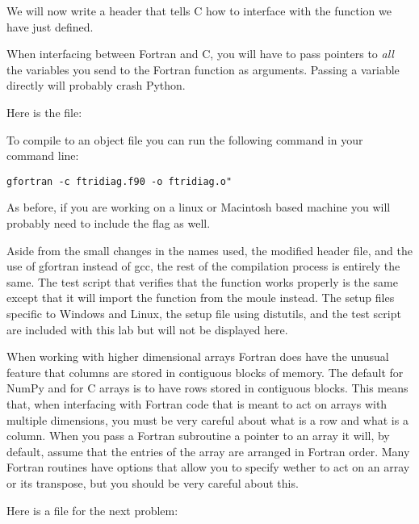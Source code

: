 We will now write a header that tells C how to interface with the function we have just defined.
\begin{warn}
When interfacing between Fortran and C, you will have to pass pointers to \emph{all} the variables you send to the Fortran function as arguments.
Passing a variable directly will probably crash Python.
\end{warn}
Here is the file:


To compile  to an object file you can run the following command in your command line:
\begin{lstlisting}[style=ShellInput]
gfortran -c ftridiag.f90 -o ftridiag.o"
\end{lstlisting}
As before, if you are working on a linux or Macintosh based machine you will probably need to include the  flag as well.

Aside from the small changes in the names used, the modified header file, and the use of gfortran instead of gcc, the rest of the compilation process is entirely the same.
The test script that verifies that the function works properly is the same except that it will import the function from the moule  instead.
The setup files specific to Windows and Linux, the setup file using distutils, and the test script are included with this lab but will not be displayed here.

When working with higher dimensional arrays Fortran does have the unusual feature that columns are stored in contiguous blocks of memory.
The default for NumPy and for C arrays is to have rows stored in contiguous blocks.
This means that, when interfacing with Fortran code that is meant to act on arrays with multiple dimensions, you must be very careful about what is a row and what is a column.
When you pass a Fortran subroutine a pointer to an array it will, by default, assume that the entries of the array are arranged in Fortran order.
Many Fortran routines have options that allow you to specify wether to act on an array or its transpose, but you should be very careful about this.

Here is a file for the next problem:


